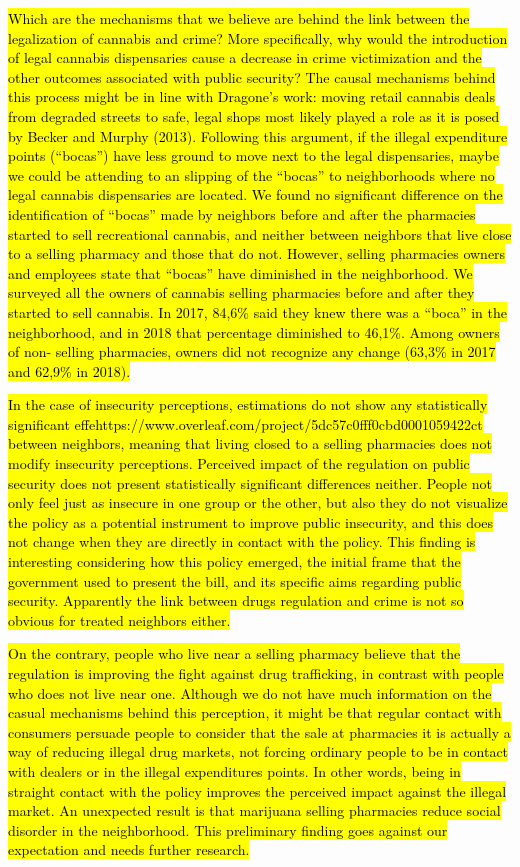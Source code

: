 \documentclass[11pt]{article}
\begin{document}
\hl{Which are the mechanisms that we believe are behind the link between the legalization of cannabis and crime? More specifically, why would the introduction of legal cannabis dispensaries cause a decrease in crime victimization and the other outcomes associated with public security? The causal mechanisms behind this process might be in line with Dragone's work: moving retail cannabis deals from degraded streets to safe, legal shops most likely played a role as it is posed by Becker and Murphy (2013). Following this argument, if the illegal expenditure points (``bocas'') have less ground to move next to the legal dispensaries, maybe we could be attending to an slipping of the ``bocas'' to neighborhoods where no legal cannabis dispensaries are located. We found no significant difference on the identification of ``bocas'' made by neighbors before and after the pharmacies started to sell recreational cannabis, and neither between neighbors that live close to a selling pharmacy and those that do not. However, selling pharmacies owners and employees state that ``bocas'' have diminished in the neighborhood. We surveyed all the owners of cannabis selling pharmacies before and after they started to sell cannabis. In 2017, 84,6\% said they knew there was a ``boca'' in the neighborhood, and in 2018 that percentage diminished to 46,1\%. Among owners of non- selling pharmacies, owners did not recognize any change (63,3\% in 2017 and 62,9\% in 2018).}

\hl{In the case of insecurity perceptions, estimations do not show any statistically significant effehttps://www.overleaf.com/project/5dc57c0fff0cbd0001059422ct between neighbors, meaning that living closed to a selling pharmacies does not modify insecurity perceptions. Perceived impact of the regulation on public security does not present statistically significant differences neither. People not only feel just as insecure in one group or the other, but also they do not visualize the policy as a potential instrument to improve public insecurity, and this does not change when they are directly in contact with the policy. This finding is interesting considering how this policy emerged, the initial frame that the government used to present the bill, and its specific aims regarding public security. Apparently the link between drugs regulation and crime is not so obvious for treated neighbors either.}

\hl{On the contrary, people who live near a selling pharmacy believe that the regulation is improving the fight against drug trafficking, in contrast with people who does not live near one. Although we do not have much information on the casual mechanisms behind this perception, it might be that regular contact with consumers persuade people to consider that the sale at pharmacies it is actually a way of reducing illegal drug markets, not forcing ordinary people to be in contact with dealers or in the illegal expenditures points. In other words, being in straight contact with the policy improves the perceived impact against the illegal market. An unexpected result is that marijuana selling pharmacies reduce social disorder in the neighborhood. This preliminary finding goes against our expectation and needs further research.}
\end{document}
